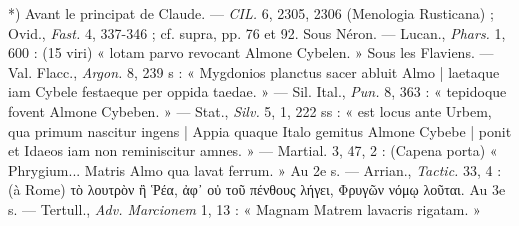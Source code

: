 \documentclass[a4paper, 11pt, oneside, polutonikogreek, french]{article}
\begin{document}
*) Avant le principat de Claude. --- \emph{CIL.} 6, 2305, 2306 (Menologia Rusticana) ; Ovid., \emph{Fast.} 4, 337-346 ; cf. supra, pp. 76 et 92.  
Sous Néron. --- Lucan., \emph{Phars.} 1, 600 : (15 viri) « lotam parvo revocant Almone Cybelen. »  
Sous les Flaviens. --- Val. Flacc., \emph{Argon.} 8, 239 s : « Mygdonios planctus sacer abluit Almo | laetaque iam Cybele festaeque per oppida taedae. » --- Sil. Ital., \emph{Pun.} 8, 363 : « tepidoque fovent Almone Cybeben. » --- Stat., \emph{Silv.} 5, 1, 222 ss : « est locus ante Urbem, qua primum nascitur ingens | Appia quaque Italo gemitus Almone Cybebe | ponit et Idaeos iam non reminiscitur amnes. » --- Martial. 3, 47, 2 : (Capena porta) « Phrygium... Matris Almo qua lavat ferrum. »  
Au 2e s. --- Arrian., \emph{Tactic.} 33, 4 : (à Rome) τὸ λουτρὸν ἢ Ῥέα, ἀφ᾽ οὐ τοῦ πένθους λήγει, Φρυγῶν νόμῳ λοῦται.  
Au 3e s. --- Tertull., \emph{Adv. Marcionem} 1, 13 : « Magnam Matrem lavacris rigatam. »  
\end{document}

